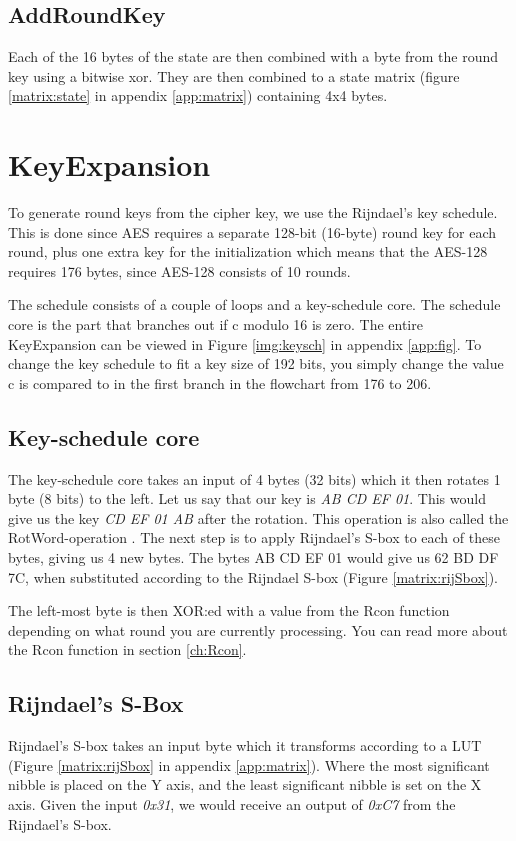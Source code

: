 \subsection{AddRoundKey}
Each of the 16 bytes of the state are then combined with a byte from the round 
key using a bitwise xor. They are then combined to a state matrix (figure 
\ref{matrix:state} in appendix \ref{app:matrix}) containing 4x4 bytes.

\section{KeyExpansion}\label{sec:KeySch}
To generate round keys from the cipher key, we use the Rijndael's key schedule. 
This is done since AES requires a separate 128-bit (16-byte) round key for each 
round, plus one extra key for the initialization which means that the AES-128 
requires 176 bytes, since AES-128 consists of 10 rounds.

The schedule consists of a couple of loops and a key-schedule core. The schedule 
core is the part that branches out if c modulo 16 is zero. The entire 
KeyExpansion can be viewed in Figure \ref{img:keysch} in appendix \ref{app:fig}. 
To change the key schedule to fit a key size of 192 bits, you simply change the 
value c is compared to in the first branch in the flowchart from 176 to 206.

\subsection{Key-schedule core}\label{sec:kCore}
The key-schedule core takes an input of 4 bytes (32 bits) which it then rotates 
1 byte (8 bits) to the left. Let us say that our key is \emph{AB CD EF 01}. This 
would give us the key \emph{CD EF 01 AB} after the rotation. This operation is 
also called the RotWord-operation \citep[p. 107]{Stinson:2006}. The next step is 
to apply Rijndael's S-box to each of these bytes, giving us 4 new bytes. The 
bytes {AB CD EF 01} would give us {62 BD DF 7C}, when substituted according to 
the Rijndael S-box (Figure \ref{matrix:rijSbox}).

The left-most byte is then XOR:ed with a value from the Rcon function depending 
on what round you are currently processing. You can read more about the Rcon 
function in section \ref{ch:Rcon}.

\subsection{Rijndael's S-Box}
Rijndael's S-box takes an input byte which it transforms according to a LUT 
(Figure \ref{matrix:rijSbox} in appendix \ref{app:matrix}). Where the most 
significant nibble is placed on the Y axis, and the least significant nibble 
is set on the X axis. Given the input \emph{0x31}, we would receive an output of 
\emph{0xC7} from the Rijndael's S-box.

